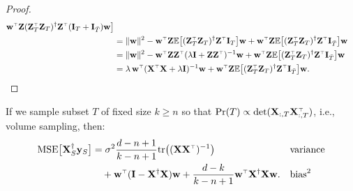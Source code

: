 \documentclass[12pt]{sty/colt2019/colt2018-arxiv}
\begin{document}
\begin{proof}
\begin{align*}
    \w^\top\Z(\Z_T^\top\Z_T)^\dagger\Z^\top(\I_T+\I_{\bar T})\w\big]\\
  &= \|\w\|^2 -
    \w^\top\Z\E\big[(\Z_T^\top\Z_T)^\dagger\Z^\top\I_T\big]\w +
    \w^\top\Z\E\big[(\Z_T^\top\Z_T)^\dagger\Z^\top\I_{\bar T}\big]\w\\
  &=\|\w\|^2 - \w^\top\Z\Z^\top(\lambda\I+\Z\Z^\top)^{-1}\w +
    \w^\top\Z\E\big[(\Z_T^\top\Z_T)^\dagger\Z^\top\I_{\bar T}\big]\w\\
  &=\lambda\,\w^\top(\X^\top\X+\lambda\I)^{-1}\w +
    \w^\top\Z\E\big[(\Z_T^\top\Z_T)^\dagger\Z^\top\I_{\bar T}\big]\w.
\end{align*}
\end{proof}
\begin{theorem}\label{t:mse-dual-tail}
If we sample subset $T$ of fixed size $k\geq n$ so that $\Pr(T)\propto
  \det(\X_{:,T}\X_{:,T}^\top)$, i.e., volume sampling, then:
  \begin{align*}
    \MSE{\X_S^\dagger\y_S}
    &= \sigma^2\frac{d-n+1}{k-n+1}\tr\big((\X\X^\top)^{-1}\big)&&\textnormal{variance}\\
    &\quad+ \w^\top(\I-\X^\dagger\X)\w + \frac{d-k}{k-n+1}\w^\top\X^\dagger\X\w.&&\textnormal{bias}^2
  \end{align*}
\end{theorem}
\end{document}
